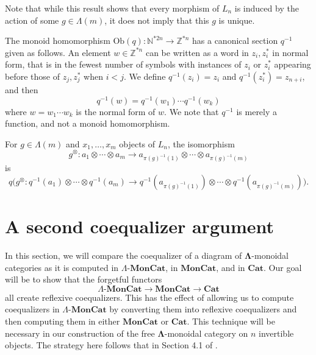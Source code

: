 \documentclass{amsbook} %
\newcommand{\mb}{\mathbf}
\newcommand{\ML}{\mathbf{\Lambda}}
\newcommand{\lmc}{\Lambda\mbox{-}\mb{MonCat}}
\newcommand{\moncat}{\ensuremath{\mb{MonCat}}}
\newcommand{\cat}{\ensuremath{\mb{Cat}}}
\numberwithin{section}{chapter}
\begin{document}
Note that while this result shows that every morphism of $L_n$ is induced by the action of some $g \in \Lambda(m)$, it does not imply that this $g$ is unique.

\begin{conv}
The monoid homomorphism $\mathrm{Ob}(q)  \colon  \mathbb{N}^{\ast 2n}  \to  \mathbb{Z}^{\ast n}$ has a canonical section $q^{-1}$ given as follows. An element $w \in \mathbb{Z}^{* n}$ can be written as a word in $z_i, z_i^*$ in normal form, that is in the fewest number of symbols with instances of $z_i$ or $z_i^*$ appearing before those of $z_j, z_j^*$ when $i < j$. We define $q^{-1}(z_i) = z_i$ and $q^{-1}(z_i^*) = z_{n+i}$, and then 
\[
q^{-1}(w) = q^{-1}(w_1) \cdots q^{-1}(w_k)
\]
where $w = w_1 \cdots w_k$ is the normal form of $w$. We note that $q^{-1}$ is merely a function, and not a monoid homomorphism.
\end{conv}

\begin{cor}\label{action_on_L}
For $g \in \Lambda(m)$ and $x_1, \ldots, x_m$ objects of $L_n$, the isomorphism
\[
g^{\otimes} \colon  a_1 \otimes \cdots \otimes a_m \to a_{\pi(g)^{-1}(1)} \otimes \cdots \otimes a_{\pi(g)^{-1}(m)}
\]
is 
\[
q \Big(g^{\otimes} \colon  q^{-1}(a_1) \otimes \cdots \otimes q^{-1}(a_m) \to   q^{-1}(a_{\pi(g)^{-1}(1)}) \otimes \cdots \otimes q^{-1}(a_{\pi(g)^{-1}(m)})    \Big).
\]
\end{cor}

\section{A second coequalizer argument}
In this section, we will compare the coequalizer of a diagram of $\ML$-monoidal categories as it is computed in $\lmc$, in $\moncat$, and in $\cat$. Our goal will be to show that the forgetful functors 
\[
\lmc \to \moncat \to \cat
\]
all create reflexive coequalizers. This has the effect of allowing us to compute coequalizers in $\lmc$ by converting them into reflexive coequalizers and then computing them in either $\moncat$ or $\cat$. This technique will be necessary in our construction of the free $\ML$-monoidal category on $n$ invertible objects. The strategy here follows that in Section 4.1 of \cite{lack-cod}.
\end{document}

